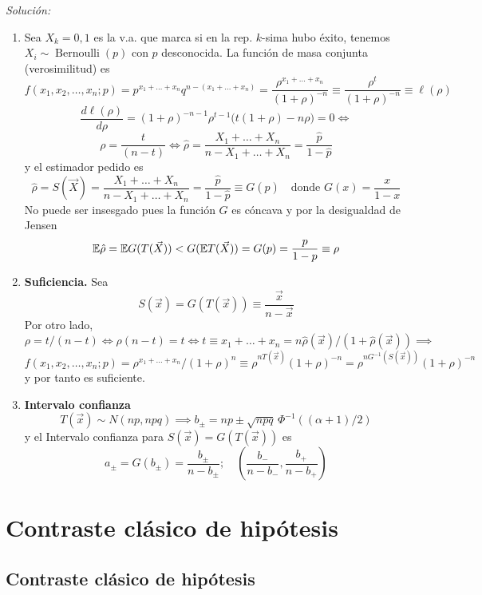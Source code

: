 \begin{enumerate}
  \smallskip
  \noindent\emph{Solución:}
  \begin{enumerate}[label=(\alph*)]
    \item Sea $X_k = 0, 1$ es la v.a. que marca si en la rep. $k$-sima hubo éxito, tenemos $X_i \sim \operatorname{Bernoulli}(p)$ con $p$ desconocida. La función de masa conjunta (verosimilitud) es
    \[
      f(x_1, x_2, \dots, x_n; p) = p^{x_1 + \dots + x_n} q^{n - (x_1 + \dots + x_n)} = \frac{\rho^{x_1 + \dots + x_n}}{(1 + \rho)^{-n}} \equiv \frac{\rho^{t}}{(1 + \rho)^{-n}} \equiv \ell(\rho)
    \]
    \[
      \frac{d\ell(\rho)}{d\rho} = (1 + \rho)^{-n-1} \rho^{t-1} \bigl(t(1 + \rho) - n\rho\bigr) = 0 \iff
    \]
    \[
      \rho = \frac{t}{(n - t)} \iff \hat{\rho} = \frac{X_1 + \dots + X_n}{n - X_1 + \dots + X_n} = \frac{\hat{p}}{1 - \hat{p}}
    \]
    y el estimador pedido es
    \[
      \hat{\rho} = S(\vec{X}) = \frac{X_1 + \dots + X_n}{n - X_1 + \dots + X_n} = \frac{\hat{p}}{1 - \hat{p}} \equiv G(\hat{p}) \quad \text{donde } G(x) = \frac{x}{1 - x}
    \]
    No puede ser insesgado pues la función $G$ es cóncava y por la desigualdad de Jensen
    \[
      \mathbb{E}\hat{\rho} = \mathbb{E} G(T(\vec{X})) < G(\mathbb{E} T(\vec{X})) = G(p) = \frac{p}{1 - p} \equiv \rho
    \]
    \item \textbf{Suficiencia.} Sea
\[
  S(\vec{x}) = G(T(\vec{x})) \equiv \frac{\vec{x}}{n - \vec{x}}
\]
Por otro lado, $\rho = t/(n - t) \iff \rho(n - t) = t \iff t \equiv x_1 + \dots + x_n = n\hat{\rho}(\vec{x})/(1 + \hat{\rho}(\vec{x})) \implies$
\[
  f(x_1, x_2, \dots, x_n; p) = \rho^{x_1 + \dots + x_n} / (1 + \rho)^n \equiv \rho^{nT(\vec{x})}(1 + \rho)^{-n} = \rho^{nG^{-1}(S(\vec{x}))}(1 + \rho)^{-n}
\]
y por tanto es suficiente.

\item \textbf{Intervalo confianza}
\[
  T(\vec{x}) \sim N(np, npq) \implies b_\pm = np \pm \sqrt{npq}\,\Phi^{-1}((\alpha + 1)/2)
\]
y el Intervalo confianza para $S(\vec{x}) = G(T(\vec{x}))$ es
\[
  a_\pm = G(b_\pm) = \frac{b_\pm}{n - b_\pm}; \quad \left(\frac{b_-}{n - b_-}, \frac{b_+}{n - b_+}\right)
\]
  \end{enumerate}
\end{enumerate}
\chapter{Contraste clásico de hipótesis}

\section{Contraste clásico de hipótesis}

